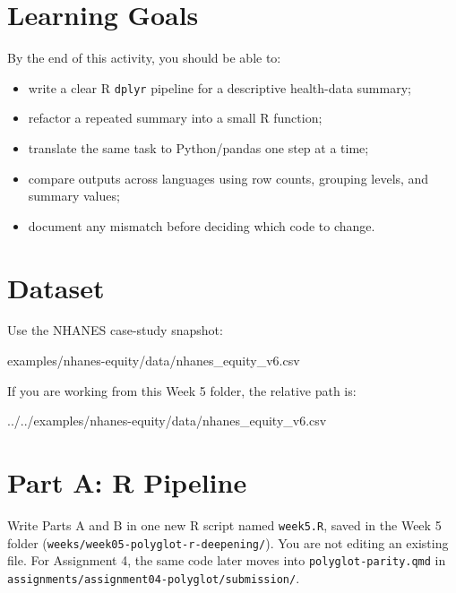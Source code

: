 \documentclass[
  letterpaper,
  DIV=11,
  numbers=noendperiod,
  oneside]{scrreprt}
\newenvironment{Shaded}{\begin{snugshade}}{\end{snugshade}}
\newcommand{\NormalTok}[1]{\textcolor[rgb]{0.00,0.23,0.31}{#1}}
\providecommand{\tightlist}{%
  \setlength{\itemsep}{0pt}\setlength{\parskip}{0pt}}
\begin{document}
\section{Learning Goals}\label{learning-goals}

By the end of this activity, you should be able to:

\begin{itemize}
\tightlist
\item
  write a clear R \texttt{dplyr} pipeline for a descriptive health-data
  summary;
\item
  refactor a repeated summary into a small R function;
\item
  translate the same task to Python/pandas one step at a time;
\item
  compare outputs across languages using row counts, grouping levels,
  and summary values;
\item
  document any mismatch before deciding which code to change.
\end{itemize}

\section{Dataset}\label{dataset}

Use the NHANES case-study snapshot:

\begin{Shaded}
\begin{Highlighting}[numbers=left,,]
\NormalTok{examples/nhanes{-}equity/data/nhanes\_equity\_v6.csv}
\end{Highlighting}
\end{Shaded}

If you are working from this Week 5 folder, the relative path is:

\begin{Shaded}
\begin{Highlighting}[numbers=left,,]
\NormalTok{../../examples/nhanes{-}equity/data/nhanes\_equity\_v6.csv}
\end{Highlighting}
\end{Shaded}

\section{Part A: R Pipeline}\label{part-a-r-pipeline}

Write Parts A and B in one new R script named \texttt{week5.R}, saved in
the Week 5 folder (\texttt{weeks/week05-polyglot-r-deepening/}). You are
not editing an existing file. For Assignment 4, the same code later
moves into \texttt{polyglot-parity.qmd} in
\texttt{assignments/assignment04-polyglot/submission/}.
\end{document}
